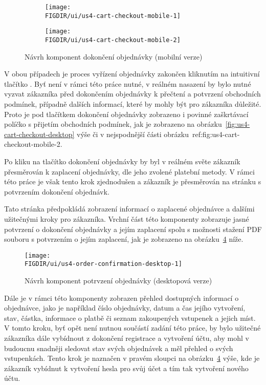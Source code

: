 \begin{figure}[H]
    \centering
    \begin{subfigure}{0.4\textwidth}
        \texttt{[image: \\FIGDIR/ui/us4-cart-checkout-mobile-1]}
        \label{fig:us4-cart-checkout-mobile-1}
    \end{subfigure}
    \hfill
    \begin{subfigure}{0.4\textwidth}
        \texttt{[image: \\FIGDIR/ui/us4-cart-checkout-mobile-2]}
        \label{fig:us4-cart-checkout-mobile-2}
    \end{subfigure}

    \caption{Návrh komponent dokončení objednávky (mobilní verze)}
    \label{fig:us4-cart-checkout-mobile}
\end{figure}

V obou případech je proces vyřízení objednávky zakončen kliknutím na intuitivní tlačítko .
Byť není v rámci této práce nutné, v reálném nasazení by bylo nutné vyzvat zákazníka před dokončením objednávky k přečtení a potvrzení obchodních podmínek, případně dalších informací, které by mohly být pro zákazníka důležité.
Proto je pod tlačítkem dokončení objednávky zobrazeno i povinné zaškrtávací políčko s přijetím obchodních podmínek, jak je zobrazeno na obrázku~\ref{fig:us4-cart-checkout-desktop} výše či v nejspodnější části obrázku~{ref:fig:us4-cart-checkout-mobile-2}.

Po kliku na tlačítko dokončení objednávky by byl v reálném světe zákazník přesměrován k zaplacení objednávky, dle jeho zvolené platební metody.
V rámci této práce je však tento krok zjednodušen a zákazník je přesměrován na stránku s potvrzením dokončení objednávk.

Tato stránka předpokládá zobrazení informací o zaplacené objednávce a dalšími užitečnými kroky pro zákazníka.
Vrchní část této komponenty zobrazuje jasné potvrzení o dokončení objednávky a jejím zaplacení spolu s možnosti stažení PDF souboru s potvrzením o jejím zaplacení, jak je zobrazeno na obrázku~\ref{fig:us4-order-confirmation-desktop} níže.

\begin{figure}[H]
    \centering
    \texttt{[image: \\FIGDIR/ui/us4-order-confirmation-desktop-1]}
    \caption{Návrh komponent potrvzení objednávky (desktopová verze)}
    \label{fig:us4-order-confirmation-desktop}
\end{figure}

Dále je v rámci této komponenty zobrazen přehled dostupných informací o objednávce, jako je například číslo objednávky, datum a čas jejího vytvoření, stav, částka, informace o platbě či seznam zakoupených vstupenek a jejich míst.
V tomto kroku, byť opět není nutnou součástí zadání této práce, by bylo užitečné zákazníka dále vybídnout z dokončení registrace a vytvoření účtu, aby mohl v budoucnu snadněji sledovat stav svých objednávek a měl přehled o svých vstupenkách.
Tento krok je naznačen v pravém sloupci na obrázku~\ref{fig:us4-order-confirmation-desktop} výše, kde je zákazník vybídnut k vytvoření hesla pro svůj účet a tím tak vytvoření nového účtu.

